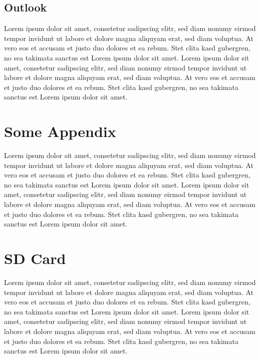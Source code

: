 \documentclass[11pt,oneside,a4paper]{book}
\makeatletter
\newcommand{\demotechaptersintoc}{%
  \addtocontents{toc}{\let\protect\l@chapter\protect\l@section}%
}
\makeatother
\begin{document}
\section{Outlook}
Lorem ipsum dolor sit amet, consetetur sadipscing elitr, sed diam nonumy eirmod tempor invidunt ut labore et dolore magna aliquyam erat, sed diam voluptua. At vero eos et accusam et justo duo dolores et ea rebum. Stet clita kasd gubergren, no sea takimata sanctus est Lorem ipsum dolor sit amet. Lorem ipsum dolor sit amet, consetetur sadipscing elitr, sed diam nonumy eirmod tempor invidunt ut labore et dolore magna aliquyam erat, sed diam voluptua. At vero eos et accusam et justo duo dolores et ea rebum. Stet clita kasd gubergren, no sea takimata sanctus est Lorem ipsum dolor sit amet.

\newpage\null\thispagestyle{empty}\newpage

\appendix
\addappheadtotoc
\demotechaptersintoc
\chapter{Some Appendix}
Lorem ipsum dolor sit amet, consetetur sadipscing elitr, sed diam nonumy eirmod tempor invidunt ut labore et dolore magna aliquyam erat, sed diam voluptua. At vero eos et accusam et justo duo dolores et ea rebum. Stet clita kasd gubergren, no sea takimata sanctus est Lorem ipsum dolor sit amet. Lorem ipsum dolor sit amet, consetetur sadipscing elitr, sed diam nonumy eirmod tempor invidunt ut labore et dolore magna aliquyam erat, sed diam voluptua. At vero eos et accusam et justo duo dolores et ea rebum. Stet clita kasd gubergren, no sea takimata sanctus est Lorem ipsum dolor sit amet.
\chapter{SD Card}
Lorem ipsum dolor sit amet, consetetur sadipscing elitr, sed diam nonumy eirmod tempor invidunt ut labore et dolore magna aliquyam erat, sed diam voluptua. At vero eos et accusam et justo duo dolores et ea rebum. Stet clita kasd gubergren, no sea takimata sanctus est Lorem ipsum dolor sit amet. Lorem ipsum dolor sit amet, consetetur sadipscing elitr, sed diam nonumy eirmod tempor invidunt ut labore et dolore magna aliquyam erat, sed diam voluptua. At vero eos et accusam et justo duo dolores et ea rebum. Stet clita kasd gubergren, no sea takimata sanctus est Lorem ipsum dolor sit amet.

\printbibliography[title={References}, nottype=online]
\printbibliography[title={Online References}, type=online]

\newpage\null\thispagestyle{empty}\newpage
\end{document}
